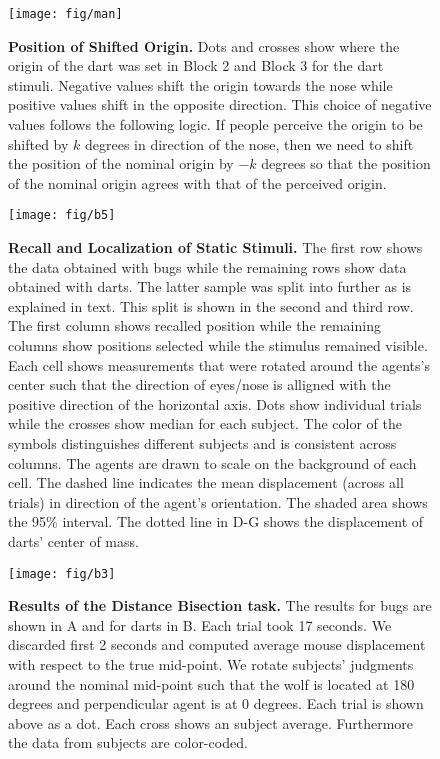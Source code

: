 \documentclass[10pt]{article}
\begin{document}
\begin{figure}[!ht]
\begin{center}
\texttt{[image: fig/man]}
\end{center}
\caption{
{\bf Position of Shifted Origin.}
Dots and crosses show where the origin of the dart was set in Block 2 and Block 3 for the dart stimuli. 
Negative values shift the origin towards the nose while positive values shift in the opposite direction.
This choice of negative values follows the following logic. 
If people perceive the origin to be shifted by $k$ degrees in direction of the nose, then we need to shift the position of the nominal origin by $-k$ degrees so that the position of the nominal origin agrees with that of the perceived origin.}
\label{fig:man}
\end{figure}

\begin{figure}[!ht]
\begin{center}
\texttt{[image: fig/b5]}
\end{center}
\caption{
{\bf Recall and Localization of Static Stimuli.}
The first row shows the data obtained with bugs while the remaining rows show data obtained with darts. 
The latter sample was split into further as is explained in text. This split is shown in the second and third row.
The first column shows recalled position while the remaining columns show positions selected while the stimulus remained visible.
Each cell shows measurements that were rotated around the agents's center such that the direction of eyes/nose is alligned with the positive direction of the horizontal axis.  
Dots show individual trials while the crosses show median for each subject.  
The color of the symbols distinguishes different subjects and is consistent across columns.
The agents are drawn to scale on the background of each cell.  
The dashed line indicates the mean displacement (across all trials) in direction of the agent's orientation. 
The shaded area shows the 95\% interval. 
The dotted line in D-G shows the displacement of darts' center of mass.}
\label{fig:b5}
\end{figure}

\begin{figure}[!ht]
\begin{center}
\texttt{[image: fig/b3]}
\end{center}
\caption{
{\bf Results of the Distance Bisection task.}
The results for bugs are shown in A and for darts in B.
Each trial took 17 seconds. We discarded first 2 seconds and computed average mouse displacement with respect to the true mid-point. We 
rotate subjects' judgments around the nominal mid-point such that the wolf is located at 180 degrees and perpendicular agent is at 0 degrees. Each trial is shown above as a dot. Each cross shows an subject average. Furthermore the data from subjects are color-coded.}
\label{fig:b3}
\end{figure}
\end{document}
